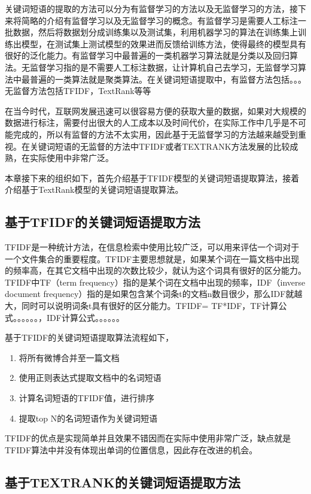 \documentclass[master]{njuthesis}
\begin{document}
    关键词短语的提取的方法可以分为有监督学习的方法以及无监督学习的方法，接下来将简略的介绍有监督学习以及无监督学习的概念。有监督学习是需要人工标注一批数据，然后将数据划分成训练集以及测试集，利用机器学习的算法在训练集上训练出模型，在测试集上测试模型的效果进而反馈给训练方法，使得最终的模型具有很好的泛化能力。有监督学习中最普遍的一类机器学习算法就是分类以及回归算法。无监督学习指的是不需要人工标注数据，让计算机自己去学习，无监督学习算法中最普遍的一类算法就是聚类算法。在关键词短语提取中，有监督方法包括。。。无监督方法包括TFIDF，TextRank等等

    在当今时代，互联网发展迅速可以很容易方便的获取大量的数据，如果对大规模的数据进行标注，需要付出很大的人工成本以及时间代价，在实际工作中几乎是不可能完成的，所以有监督的方法不太实用，因此基于无监督学习的方法越来越受到重视。在关键词短语的无监督的方法中TFIDF或者TEXTRANK方法发展的比较成熟，在实际使用中非常广泛。
    
    本章接下来的组织如下，首先介绍基于TFIDF模型的关键词短语提取算法，接着介绍基于TextRank模型的关键词短语提取算法。

\subsection{基于TFIDF的关键词短语提取方法}

    TFIDF是一种统计方法，在信息检索中使用比较广泛，可以用来评估一个词对于一个文件集合的重要程度。TFIDF主要思想就是，如果某个词在一篇文档中出现的频率高，在其它文档中出现的次数比较少，就认为这个词具有很好的区分能力。TFIDF中TF（term frequency）指的是某个词在文档中出现的频率，IDF（inverse document frequency）指的是如果包含某个词条t的文档n数目很少，那么IDF就越大，同时可以说明词条t具有很好的区分能力。TFIDF= TF*IDF，TF计算公式。。。。。。，IDF计算公式。。。。。。
    
    基于TFIDF的关键词短语提取算法流程如下，
    \begin{enumerate}
      \item 将所有微博合并至一篇文档
      \item 使用正则表达式提取文档中的名词短语
      \item 计算名词短语的TFIDF值，进行排序
      \item 提取top N的名词短语作为关键词短语
    \end{enumerate}
      
    TFIDF的优点是实现简单并且效果不错因而在实际中使用非常广泛，缺点就是TFIDF算法中并没有体现出单词的位置信息，因此存在改进的机会。

\subsection{基于TEXTRANK的关键词短语提取方法}
\end{document}
